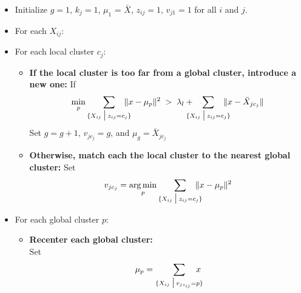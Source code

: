 \documentclass[11pt]{article}
\newcommand{\st}{ \; \big | \:}
\theoremstyle{definition}
\DeclareMathOperator*{\argmin}{arg\,min}
\begin{document}
\begin{itemize}
    \item Initialize $g=1$, $k_j=1$, $\mu_1$ = $\bar X$, $z_{ij}=1$, $v_{j1}=1$ for all $i$ and $j$.
    \item For each $X_{ij}$:
    \item For each local cluster $c_j$:
        \begin{itemize}
            \item{\bf If the local cluster is too far from a global cluster, introduce a new one:}
                If 
                \[\min_p\sum_{\{X_{ij}\st z_{ij}=c_j\}}\hspace{-1em} \|x-\mu_p\|^2\;>\;\lambda_l+ \hspace{-1em} \sum_{\{X_{ij}\st z_{ij}=c_j\}}\hspace{-1em}\|x-\bar X_{jc_j}\| \]
                Set $g=g+1$, $v_{jc_j}=g$, and $\mu_g=\bar X_{jc_j}$
            \item{\bf Otherwise, match each the local cluster to the nearest global cluster:}
                Set 
                \[v_{jc_j} = \argmin_p\sum_{\{X_{ij}\st z_{ij}=c_j\}}\hspace{-1em} \|x-\mu_p\|^2\]
        \end{itemize}
    \item For each global cluster $p$:
        \begin{itemize}
            \item {\bf Recenter each global cluster:}\\
                Set
                \[ \mu_p = \sum_{\{X_{ij}\st v_{jz_{ij}}=p\}}\hspace{-1em} x \]
        \end{itemize}
\end{itemize}
\end{document}

